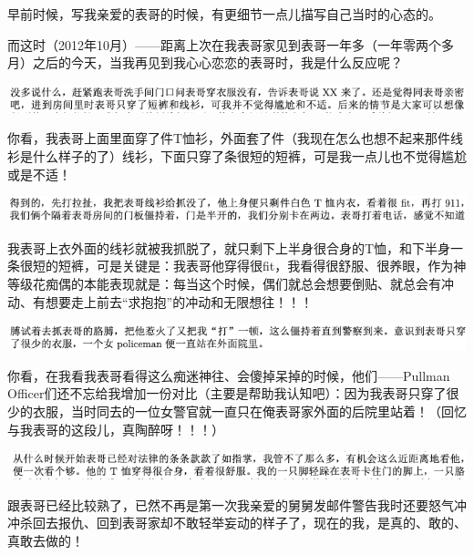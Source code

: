 \documentclass[9pt, b5paper]{article}
\begin{document}
早前时候，写我亲爱的表哥的时候，有更细节一点儿描写自己当时的心态的。

而这时（2012年10月）——距离上次在我表哥家见到表哥一年多（一年零两个多月）之后的今天，当我再见到我心心恋恋的表哥时，我是什么反应呢？

\begin{center}
\includegraphics[width=.9\linewidth]{./pic/backups_plans_20210502_112215.png}
\end{center}

你看，我表哥上面里面穿了件T恤衫，外面套了件（我现在怎么也想不起来那件线衫是什么样子的了）线衫，下面只穿了条很短的短裤，可是我一点儿也不觉得尴尬或是不适！

\begin{center}
\includegraphics[width=.9\linewidth]{./pic/backups_plans_20210502_112432.png}
\end{center}

我表哥上衣外面的线衫就被我抓脱了，就只剩下上半身很合身的T恤，和下半身一条很短的短裤，可是关键是：我表哥他穿得很fit，我看得很舒服、很养眼，作为神等级花痴偶的本能表现就是：每当这个时候，偶们就总会想要倒贴、就总会有冲动、有想要走上前去“求抱抱”的冲动和无限想往！！！

\begin{center}
\includegraphics[width=.9\linewidth]{./pic/backups_plans_20210502_113425.png}
\end{center}

你看，在我看我表哥看得这么痴迷神往、会傻掉呆掉的时候，他们——Pullman Officer们还不忘给我增加一份对比（主要是帮助我认知吧）：因为我表哥只穿了很少的衣服，当时同去的一位女警官就一直只在俺表哥家外面的后院里站着！（回忆与我表哥的这段儿，真陶醉呀！！！）

\begin{center}
\includegraphics[width=.9\linewidth]{./pic/backups_plans_20210502_113127.png}
\end{center}

跟表哥已经比较熟了，已然不再是第一次我亲爱的舅舅发邮件警告我时还要怒气冲冲杀回去报仇、回到表哥家却不敢轻举妄动的样子了，现在的我，是真的、敢的、真敢去做的！
\end{document}
